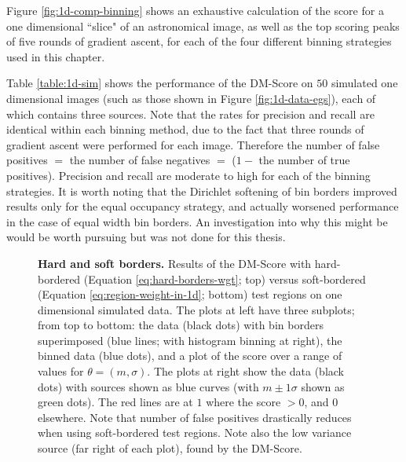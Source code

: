 Figure \ref{fig:1d-comp-binning} shows an exhaustive calculation of the score for a one dimensional ``slice" of an astronomical image, as well as the top scoring peaks of five rounds of gradient ascent, for each of the four different binning strategies used in this chapter. 

Table \ref{table:1d-sim} shows the performance of the DM-Score on $50$ simulated one dimensional images (such as those shown in Figure \ref{fig:1d-data-egs}), each of which contains three sources. Note that the rates for precision and recall are identical within each binning method, due to the fact that three rounds of gradient ascent were performed for each image. Therefore the number of false positives $=$ the number of false negatives $=$ ($1-$ the number of true positives). Precision and recall are moderate to high for each of the binning strategies. It is worth noting that the Dirichlet softening of bin borders improved results only for the equal occupancy strategy, and actually worsened performance in the case of equal width bin borders. An investigation into why this might be would be worth pursuing but was not done for this thesis.

\begin{figure}
\centering
{}
\caption[Hard-bordered versus soft-bordered test regions]{\textbf{Hard and soft borders.} Results of the DM-Score with hard-bordered (Equation \ref{eq:hard-borders-wgt}; top) versus soft-bordered (Equation \ref{eq:region-weight-in-1d}; bottom) test regions on one dimensional simulated data. The plots at left have three subplots; from top to bottom: the data (black dots) with bin borders superimposed (blue lines; with histogram binning at right), the binned data (blue dots), and a plot of the score over a range of values for $\theta = (m,\sigma)$. The plots at right show the data (black dots) with sources shown as blue curves (with $m \pm 1 \sigma$ shown as green dots). The red lines are at $1$ where the score $> 0$, and $0$ elsewhere. Note that number of false positives drastically reduces when using soft-bordered test regions. Note also the low variance source (far right of each plot), found by the DM-Score.}
\label{fig:hard-to-soft}
\end{figure}

